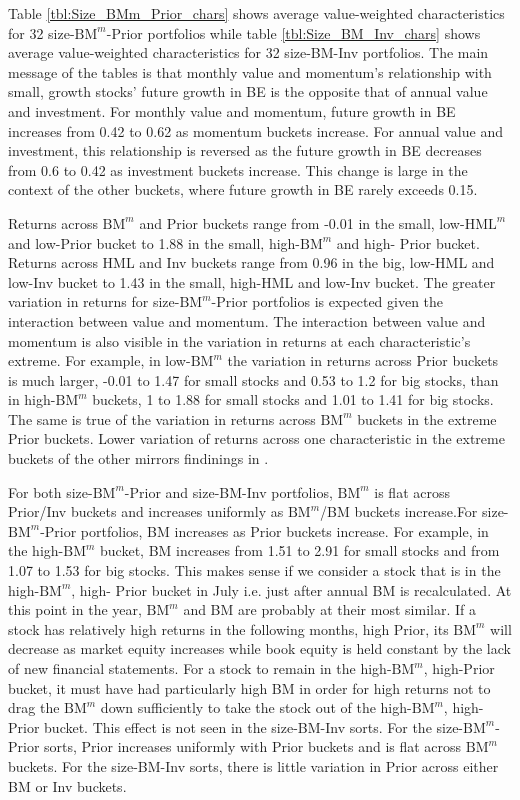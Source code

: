 
Table \ref{tbl:Size_BMm_Prior_chars} shows average value-weighted characteristics for 32
size-$\text{BM}^m$-Prior portfolios while table \ref{tbl:Size_BM_Inv_chars} shows average
value-weighted characteristics for 32 size-BM-Inv portfolios. The main message of the
tables is that monthly value and momentum's relationship with small, growth stocks' future
growth in BE is the opposite that of annual value and investment. For monthly value and
momentum, future growth in BE increases from 0.42 to 0.62 as momentum buckets increase.
For annual value and investment, this relationship is reversed as the future growth in BE
decreases from 0.6 to 0.42 as investment buckets increase. This change is large in the
context of the other buckets, where future growth in BE rarely exceeds 0.15.

Returns across $\text{BM}^m$ and Prior buckets range from -0.01 in the small,
low-$\text{HML}^m$ and low-Prior bucket to 1.88 in the small, high-$\text{BM}^m$ and high-
Prior bucket. Returns across HML and Inv buckets range from 0.96 in the big, low-HML and
low-Inv bucket to 1.43 in the small, high-HML and low-Inv bucket. The greater variation in
returns for size-$\text{BM}^m$-Prior portfolios is expected given the interaction between
value and momentum. The interaction between value and momentum is also visible in the
variation in returns at each characteristic's extreme. For example, in low-$\text{BM}^m$
the variation in returns across Prior buckets is much larger, -0.01 to 1.47 for small
stocks and 0.53 to 1.2 for big stocks, than in high-$\text{BM}^m$ buckets, 1 to 1.88 for
small stocks and 1.01 to 1.41 for big stocks. The same is true of the variation in returns
across $\text{BM}^m$ buckets in the extreme Prior buckets. Lower variation of returns
across one characteristic in the extreme buckets of the other mirrors findinings in
\textcite{asness2013devil}.

For both size-$\text{BM}^m$-Prior and size-BM-Inv portfolios, $\text{BM}^m$ is flat across
Prior/Inv buckets and increases uniformly as $\text{BM}^m$/BM buckets increase.For
size-$\text{BM}^m$-Prior portfolios, BM increases as Prior buckets increase. For example,
in the high-$\text{BM}^m$ bucket, BM increases from 1.51 to 2.91 for small stocks and from
1.07 to 1.53 for big stocks. This makes sense if we consider a stock that is in the
high-$\text{BM}^m$, high- Prior bucket in July i.e. just after annual BM is recalculated.
At this point in the year, $\text{BM}^m$ and BM are probably at their most similar. If a
stock has relatively high returns in the following months, high Prior, its $\text{BM}^m$
will decrease as market equity increases while book equity is held constant by the lack of
new financial statements. For a stock to remain in the high-$\text{BM}^m$, high-Prior
bucket, it must have had particularly high BM in order for high returns not to drag the
$\text{BM}^m$ down sufficiently to take the stock out of the high-$\text{BM}^m$, high-
Prior bucket. This effect is not seen in the size-BM-Inv sorts. For the
size-$\text{BM}^m$-Prior sorts, Prior increases uniformly with Prior buckets and is flat
across $\text{BM}^m$ buckets. For the size-BM-Inv sorts, there is little variation in
Prior across either BM or Inv buckets.

